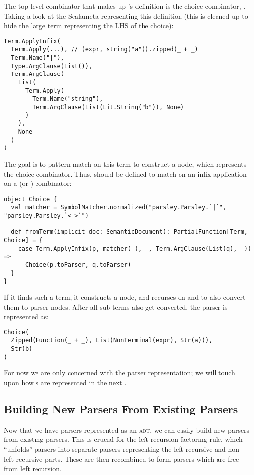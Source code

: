 \documentclass[../../main.tex]{subfiles}
\begin{document}
The top-level combinator that makes up 's definition is the choice combinator, \scala{|}.
Taking a look at the Scalameta  representing this definition 
(this is cleaned up to hide the large term representing the LHS of the choice):
\begin{verbatim}
Term.ApplyInfix(
  Term.Apply(...), // (expr, string("a")).zipped(_ + _)
  Term.Name("|"),
  Type.ArgClause(List()),
  Term.ArgClause(
    List(
      Term.Apply(
        Term.Name("string"),
        Term.ArgClause(List(Lit.String("b")), None)
      )
    ),
    None
  )
)
\end{verbatim}
%
The goal is to pattern match on this term to construct a  node, which represents the choice combinator.
Thus,  should be defined to match on an infix application on a \scala{|} (or \scala{<|>}) combinator:
\begin{verbatim}
object Choice {
  val matcher = SymbolMatcher.normalized("parsley.Parsley.`|`", "parsley.Parsley.`<|>`")

  def fromTerm(implicit doc: SemanticDocument): PartialFunction[Term, Choice] = {
    case Term.ApplyInfix(p, matcher(_), _, Term.ArgClause(List(q), _)) =>
      Choice(p.toParser, q.toParser)
  }
}
\end{verbatim}
If it finds such a term, it constructs a  node, and recurses on  and  to also convert them to parser nodes.
After all sub-terms also get converted, the  parser is represented as:
\begin{verbatim}
Choice(
  Zipped(Function(_ + _), List(NonTerminal(expr), Str(a))),
  Str(b)
)
\end{verbatim}
For now we are only concerned with the parser representation; we will touch upon how s are represented in the next .

\subsection{Building New Parsers From Existing Parsers}
Now that we have parsers represented as an \textsc{adt}, we can easily build new parsers from existing parsers.
This is crucial for the left-recursion factoring rule, which ``unfolds'' parsers into separate parsers representing the left-recursive and non-left-recursive parts.
These are then recombined to form parsers which are free from left recursion.
\end{document}
